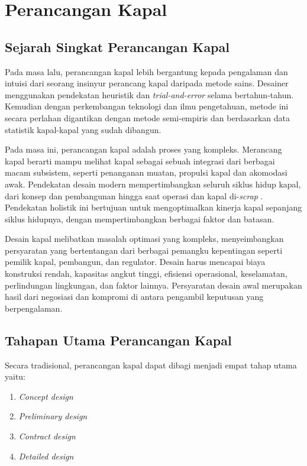 \section{Perancangan Kapal}
\label{sec:perancangan-kapal}

\subsection{Sejarah Singkat Perancangan Kapal}
\label{subsec:sejarah-singkat-deskap}

Pada masa lalu, perancangan kapal lebih bergantung kepada pengalaman dan intuisi dari seorang insinyur perancang kapal daripada metode sains. Desainer menggunakan pendekatan heuristik dan \emph{trial-and-error} selama bertahun-tahun. Kemudian dengan perkembangan teknologi dan ilmu pengetahuan, metode ini secara perlahan digantikan dengan metode semi-empiris dan berdasarkan data statistik kapal-kapal yang sudah dibangun.

Pada masa ini, perancangan kapal adalah proses yang kompleks. Merancang kapal berarti mampu melihat kapal sebagai sebuah integrasi dari berbagai macam subsistem, seperti penanganan muatan, propulsi kapal dan akomodasi awak. Pendekatan desain modern mempertimbangkan seluruh siklus hidup kapal, dari konsep dan pembangunan hingga saat operasi dan kapal di-\emph{scrap} \citep{Papanikolaou_2014}. Pendekatan holistik ini bertujuan untuk mengoptimalkan kinerja kapal sepanjang siklus hidupnya, dengan mempertimbangkan berbagai faktor dan batasan.

Desain kapal melibatkan masalah optimasi yang kompleks, menyeimbangkan persyaratan yang bertentangan dari berbagai pemangku kepentingan seperti pemilik kapal, pembangun, dan regulator. Desain harus mencapai biaya konstruksi rendah, kapasitas angkut tinggi, efisiensi operasional, keselamatan, perlindungan lingkungan, dan faktor lainnya. Persyaratan desain awal merupakan hasil dari negosiasi dan kompromi di antara pengambil keputusan yang berpengalaman.

\subsection{Tahapan Utama Perancangan Kapal}
\label{subsec:tahapan-utama-deskap}

Secara tradisional, perancangan kapal dapat dibagi menjadi empat tahap utama yaitu:
\begin{enumerate}[label=\alph*.]
    \item \emph{Concept design}
    \item \emph{Preliminary design}
    \item \emph{Contract design}
    \item \emph{Detailed design}
\end{enumerate}

